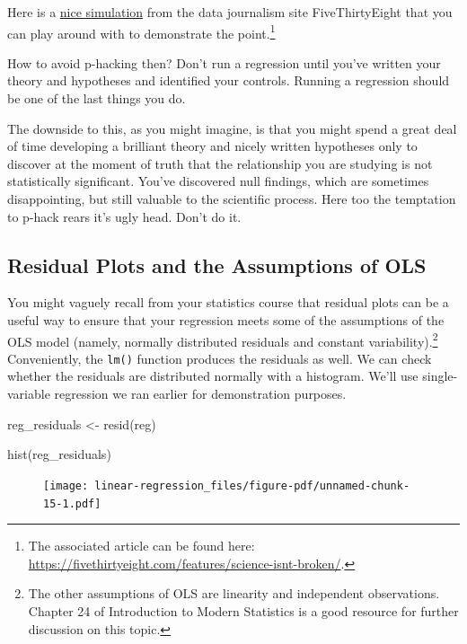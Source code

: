 \documentclass[
  letterpaper,
]{book}
\newenvironment{Shaded}{\begin{snugshade}}{\end{snugshade}}
\newcommand{\FunctionTok}[1]{\textcolor[rgb]{0.28,0.35,0.67}{#1}}
\newcommand{\NormalTok}[1]{\textcolor[rgb]{0.00,0.23,0.31}{#1}}
\newcommand{\OtherTok}[1]{\textcolor[rgb]{0.00,0.23,0.31}{#1}}
\begin{document}
Here is a \href{https://projects.fivethirtyeight.com/p-hacking/}{nice
simulation} from the data journalism site FiveThirtyEight that you can
play around with to demonstrate the point.\footnote{The associated
  article can be found here:
  \url{https://fivethirtyeight.com/features/science-isnt-broken/}.}

How to avoid p-hacking then? Don't run a regression until you've written
your theory and hypotheses and identified your controls. Running a
regression should be one of the last things you do.

The downside to this, as you might imagine, is that you might spend a
great deal of time developing a brilliant theory and nicely written
hypotheses only to discover at the moment of truth that the relationship
you are studying is not statistically significant. You've discovered
null findings, which are sometimes disappointing, but still valuable to
the scientific process. Here too the temptation to p-hack rears it's
ugly head. Don't do it.

\hypertarget{residual-plots-and-the-assumptions-of-ols}{%
\subsection{Residual Plots and the Assumptions of
OLS}\label{residual-plots-and-the-assumptions-of-ols}}

You might vaguely recall from your statistics course that residual plots
can be a useful way to ensure that your regression meets some of the
assumptions of the OLS model (namely, normally distributed residuals and
constant variability).\footnote{The other assumptions of OLS are
  linearity and independent observations. Chapter 24 of Introduction to
  Modern Statistics is a good resource for further discussion on this
  topic.} Conveniently, the \texttt{lm()} function produces the
residuals as well. We can check whether the residuals are distributed
normally with a histogram. We'll use single-variable regression we ran
earlier for demonstration purposes.

\begin{Shaded}
\begin{Highlighting}[]
\NormalTok{reg\_residuals }\OtherTok{\textless{}{-}} \FunctionTok{resid}\NormalTok{(reg)}

\FunctionTok{hist}\NormalTok{(reg\_residuals)}
\end{Highlighting}
\end{Shaded}

\begin{figure}[H]

{\centering \texttt{[image: linear-regression\_files/figure-pdf/unnamed-chunk-15-1.pdf]}

}

\end{figure}
\end{document}
